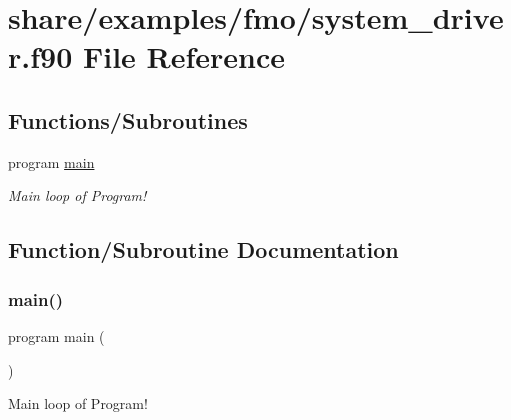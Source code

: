 \hypertarget{share_2examples_2fmo_2system__driver_8f90}{}\section{share/examples/fmo/system\+\_\+driver.f90 File Reference}
\label{share_2examples_2fmo_2system__driver_8f90}
\subsection*{Functions/\+Subroutines}
\begin{DoxyCompactItemize}
\item 
program \hyperlink{share_2examples_2fmo_2system__driver_8f90_a8ec2266d83cd6c0b762cbcbc92c0af3d}{main}
\begin{DoxyCompactList}\small\item\em Main loop of Program! \end{DoxyCompactList}\end{DoxyCompactItemize}


\subsection{Function/\+Subroutine Documentation}
\mbox{\label{share_2examples_2fmo_2system__driver_8f90_a8ec2266d83cd6c0b762cbcbc92c0af3d}} 
\subsubsection{\texorpdfstring{main()}{main()}}
{\footnotesize\ttfamily program main (\begin{DoxyParamCaption}{ }\end{DoxyParamCaption})}



Main loop of Program! 

